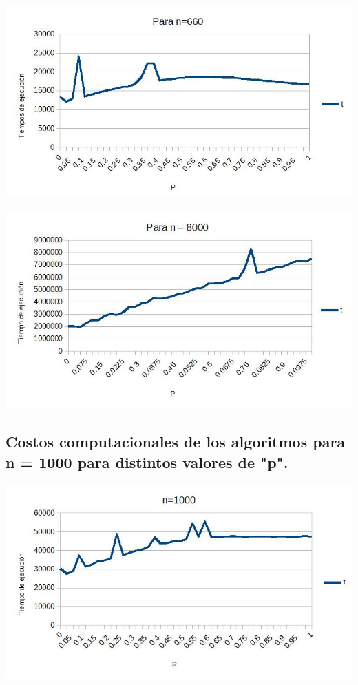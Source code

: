 \documentclass[12pt,letterpaper]{scrartcl}
\begin{document}
\includegraphics[scale=0.55]{nn}

\includegraphics[scale=0.55]{nnnn}

\subsection{Costos computacionales de los algoritmos para n = 1000 para distintos valores de "p".}

\includegraphics[scale=0.55]{nnn}
\end{document}
